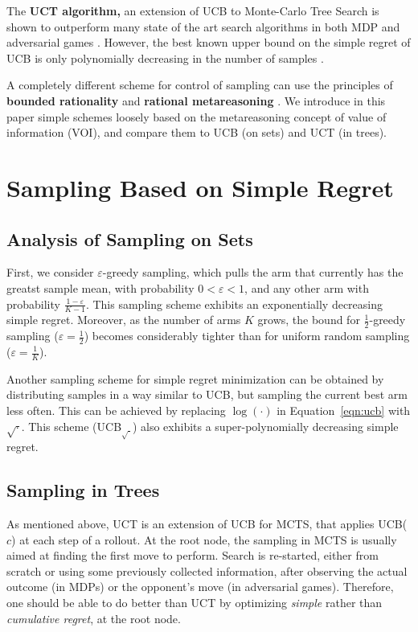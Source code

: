 \documentclass[letterpaper]{article}
\begin{document}
The {\bf UCT algorithm,} an extension of UCB
to Monte-Carlo Tree Search \cite{Kocsis.uct} is
shown to outperform many state of the art search algorithms in both
MDP and adversarial games \cite{Eyerich.ctp,GellyWang.mogo}. 
However, the best known upper bound on the simple regret of UCB is
only polynomially decreasing in the number of samples \cite{Bubeck.pure}.

A completely different scheme for control of sampling can use the
principles of {\bf bounded rationality} \cite{Horvitz.reasoningabout}
and {\bf rational metareasoning} \cite{Russell.right}. We introduce in this paper simple
schemes loosely based on the metareasoning concept of value of
information (VOI), and compare them to UCB (on sets) and UCT (in trees).


\section{Sampling Based on Simple Regret}
\label{sec:results}

\subsection{Analysis of Sampling on Sets}
\label{sec:sampling-on-sets}

First, we consider $\varepsilon$-greedy sampling, which
pulls the arm that currently has the greatst sample mean, with probability
$0<\varepsilon<1$, and any other arm with probability $\frac {1-\varepsilon} {K-1}$. 
This sampling scheme exhibits an exponentially decreasing simple
regret. Moreover, as the number of arms $K$ grows, the bound for $\frac 1
2$-greedy sampling ($\varepsilon=\frac 1 2$) becomes considerably tighter than for uniform
random sampling ($\varepsilon=\frac 1 K$).

Another sampling scheme for simple regret minimization can be obtained
by distributing samples in a way similar to UCB, but sampling the current best arm
less often. This can be achieved by replacing $\log(\cdot)$ in
Equation~\ref{eqn:ucb} with $\sqrt\cdot$. This scheme (UCB$_{\sqrt{\cdot}}$) also exhibits
a super-polynomially decreasing simple regret.

\subsection{Sampling in Trees}
\label{sec:sampling-in-trees}

As mentioned above, UCT \cite{Kocsis.uct} is an extension of UCB for
MCTS, that applies UCB($c$) at each step of a rollout.  At the root
node, the sampling in MCTS is usually aimed at finding the first move
to perform. Search is re-started, either from scratch or using some
previously collected information, after observing the actual outcome
(in MDPs) or the opponent's move (in adversarial games). Therefore,
one should be able to do better than UCT by optimizing {\em simple}
rather than {\em cumulative regret}, at the root node.
\end{document}
